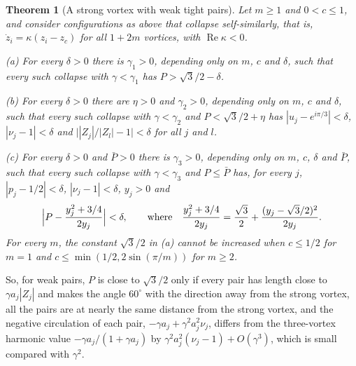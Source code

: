 \documentclass[11pt]{article}
\newtheorem{theorem}{Theorem}
\theoremstyle{definition}
\newcommand{\re}{\operatorname{Re}}
\begin{document}
\begin{theorem}[A strong vortex with weak tight pairs]\label{thm:pairs}
Let $m \ge 1$ and $0 < c \le 1$, and consider configurations as above that collapse self-similarly, that is, $\dot z_i = \kappa(z_i - z_c)$ for all $1 + 2m$ vortices, with $\re\kappa < 0$.

\textup{(a)} For every $\delta > 0$ there is $\gamma_1 > 0$, depending only on $m$, $c$ and $\delta$, such that every such collapse with $\gamma < \gamma_1$ has $P > \sqrt{3}/2 - \delta$.

\textup{(b)} For every $\delta > 0$ there are $\eta > 0$ and $\gamma_2 > 0$, depending only on $m$, $c$ and $\delta$, such that every such collapse with $\gamma < \gamma_2$ and $P < \sqrt{3}/2 + \eta$ has $|u_j - e^{i\pi/3}| < \delta$, $|\nu_j - 1| < \delta$ and $\bigl||Z_j|/|Z_l| - 1\bigr| < \delta$ for all $j$ and $l$.

\textup{(c)} For every $\delta > 0$ and $\bar P > 0$ there is $\gamma_3 > 0$, depending only on $m$, $c$, $\delta$ and $\bar P$, such that every such collapse with $\gamma < \gamma_3$ and $P \le \bar P$ has, for every $j$, $|p_j - 1/2| < \delta$, $|\nu_j - 1| < \delta$, $y_j > 0$ and
\[
  \Bigl|P - \frac{y_j^2 + 3/4}{2y_j}\Bigr| < \delta, \qquad \text{where} \quad \frac{y_j^2 + 3/4}{2y_j} = \frac{\sqrt{3}}{2} + \frac{(y_j - \sqrt{3}/2)^2}{2y_j}.
\]
For every $m$, the constant $\sqrt{3}/2$ in \textup{(a)} cannot be increased when $c \le 1/2$ for $m = 1$ and $c \le \min(1/2, 2\sin(\pi/m))$ for $m \ge 2$.
\end{theorem}

So, for weak pairs, $P$ is close to $\sqrt{3}/2$ only if every pair has length close to $\gamma a_j|Z_j|$ and makes the angle $60^\circ$ with the direction away from the strong vortex, all the pairs are at nearly the same distance from the strong vortex, and the negative circulation of each pair, $-\gamma a_j + \gamma^2 a_j^2\nu_j$, differs from the three-vortex harmonic value $-\gamma a_j/(1 + \gamma a_j)$ by $\gamma^2 a_j^2(\nu_j - 1) + O(\gamma^3)$, which is small compared with $\gamma^2$.
\end{document}

